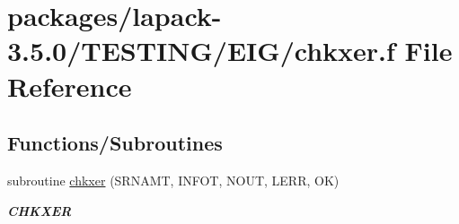 \hypertarget{EIG_2chkxer_8f}{}\section{packages/lapack-\/3.5.0/\+T\+E\+S\+T\+I\+N\+G/\+E\+I\+G/chkxer.f File Reference}
\label{EIG_2chkxer_8f}
\subsection*{Functions/\+Subroutines}
\begin{DoxyCompactItemize}
\item 
subroutine \hyperlink{group__complex__eig_gaf0279384c87f94223fdf27a4d97f4f7d}{chkxer} (S\+R\+N\+A\+M\+T, I\+N\+F\+O\+T, N\+O\+U\+T, L\+E\+R\+R, O\+K)
\begin{DoxyCompactList}\small\item\em {\bfseries C\+H\+K\+X\+E\+R} \end{DoxyCompactList}\end{DoxyCompactItemize}
